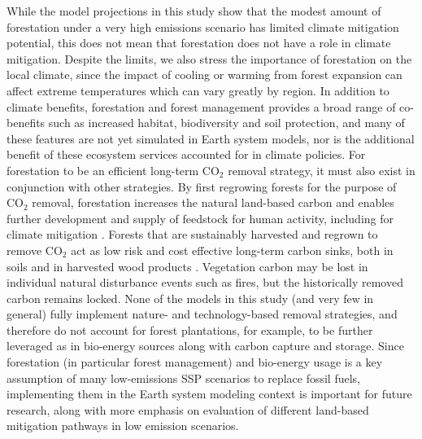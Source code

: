 \documentclass[draft]{agujournal2019}
\begin{document}
While the model projections in this study show that the modest amount of forestation under a very high emissions scenario has limited climate mitigation potential, this does not mean that forestation does not have a role in climate mitigation.
Despite the limits, we also stress the importance of forestation on the local climate, since the impact of cooling or warming from forest expansion can affect extreme temperatures which can vary greatly by region.
In addition to climate benefits, forestation and forest management provides a broad range of co-benefits such as increased habitat, biodiversity and soil protection, and many of these features are not yet simulated in Earth system models, nor is the additional benefit of these ecosystem services accounted for in climate policies.
For forestation to be an efficient long-term CO$_2$ removal strategy, it must also exist in conjunction with other strategies.
By first regrowing forests for the purpose of CO$_2$ removal, forestation increases the natural land-based carbon and enables further development and supply of feedstock for human activity, including for climate mitigation \cite{geng_review_2017}.
Forests that are sustainably harvested and regrown to remove CO$_2$ act as low risk and cost effective long-term carbon sinks, both in soils and in harvested wood products \cite{schulze_climate_2020,soimakallio_trade-offs_2021}.
Vegetation carbon may be lost in individual natural disturbance events such as fires, but the historically removed carbon remains locked.
None of the models in this study (and very few in general) fully implement nature- and technology-based removal strategies, and therefore do not account for forest plantations, for example, to be further leveraged as in bio-energy sources along with carbon capture and storage.
Since forestation (in particular forest management) and bio-energy usage is a key assumption of many low-emissions SSP scenarios to replace fossil fuels, implementing them in the Earth system modeling context is important for future research, along with more emphasis on evaluation of different land-based mitigation pathways in low emission scenarios.


%
%
%
%
\end{document}
